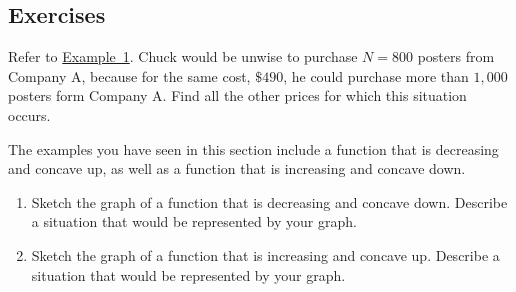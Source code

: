 \documentclass[10pt,]{book}
\theoremstyle{ptxdefinitionnotitle}
\theoremstyle{ptxdefinitiontitle}
\numberwithin{equation}{section}
\begin{document}
\subsection*{Exercises}\hypertarget{exercises-1}{}
\begin{divisionexercise}{1}\hypertarget{exercise-1}{}
\hypertarget{p-30}{}%
Refer to \hyperref[chapter02-section01-example01]{Example~1}. Chuck would be unwise to purchase \(N=800\) posters from Company A, because for the same cost, \(\$490\), he could purchase more than \(1,000\) posters form Company A. Find all the other prices for which this situation occurs.%
\end{divisionexercise}%
\begin{divisionexercise}{2}\hypertarget{exercise-2}{}
\hypertarget{p-31}{}%
The examples you have seen in this section include a function that is decreasing and concave up, as well as a function that is increasing and concave down. \leavevmode%
\begin{enumerate}[label=(\alph*)]
\item\hypertarget{li-9}{}Sketch the graph of a function that is decreasing and concave down. Describe a situation that would be represented by your graph.%
\item\hypertarget{li-10}{}Sketch the graph of a function that is increasing and concave up. Describe a situation that would be represented by your graph.%
\end{enumerate}
%
\end{divisionexercise}%
\end{document}
